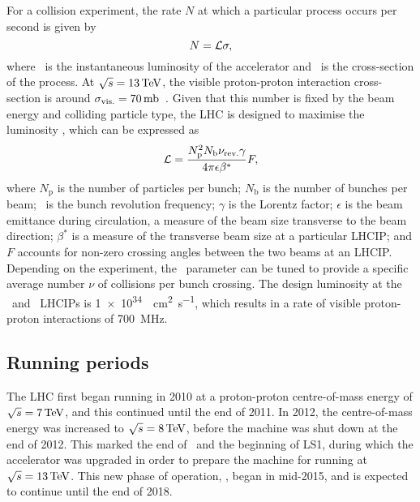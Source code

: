 For a collision experiment, the rate $N$ at which a particular process occurs 
per second is given by
\begin{equation}
  N = \mathcal{L}\sigma,
  \label{eqn:intro:lhc:lumi_xsec}
\end{equation}
where \lumi\ is the instantaneous luminosity of the accelerator and \xsec\ is 
the cross-section of the process.
At $\sqrts = \SI{13}{\TeV}$, the visible proton-proton interaction 
cross-section is around $\xsecppvis = 
\SI{70}{\milli\barn}$~\cite{Aaboud:2016mmw,CMS:2016ael}.
Given that this number is fixed by the beam energy and colliding particle type, 
the \ac{LHC} is designed to maximise the luminosity \lumi, which can be 
expressed as
\begin{equation}
  \mathcal{L} = \frac{N_{\text{p}}^{2}N_{\text{b}}\nu_{\textnormal{rev.}}\gamma}{4\pi\epsilon\beta^{*}}F,
  \label{eqn:intro:lhc:inst_lumi}
\end{equation}
where $N_{\text{p}}$ is the number of particles per bunch; $N_{\text{b}}$ is 
the number of bunches per beam; \revfreq\ is the bunch revolution frequency; 
$\gamma$ is the Lorentz factor; $\epsilon$ is the beam emittance during 
circulation, a measure of the beam size transverse to the beam direction; 
$\beta^{*}$ is a measure of the transverse beam size at a particular 
\ac{LHCIP}; and $F$ accounts for non-zero crossing angles between the two beams 
at an \ac{LHCIP}.
Depending on the experiment, the \betastar\ parameter can be tuned to provide a 
specific average number $\nu$ of collisions per bunch crossing.
The design luminosity at the \atlas\ and \cms\ \acp{LHCIP} is
\SI{1e34}{\per\square\centi\metre\per\second}, which results in a rate of 
visible proton-proton interactions of \SI{700}{\mega\hertz}.

\subsection{Running periods}

The \ac{LHC} first began running in 2010 at a proton-proton centre-of-mass 
energy of $\sqrts = \SI{7}{\TeV}$, and this continued until the end of 2011.
In 2012, the centre-of-mass energy was increased to $\sqrts = \SI{8}{\TeV}$, 
before the machine was shut down at the end of 2012.
This marked the end of \runone\ and the beginning of \acf{LS1}, during which 
the accelerator was upgraded in order to prepare the machine for running at 
$\sqrts = \SI{13}{\TeV}$.
This new phase of operation, \runtwo, began in mid-2015, and is expected to 
continue until the end of 2018.
